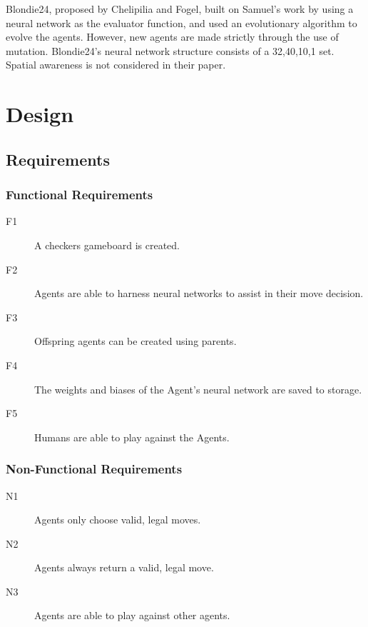 \documentclass[12pt,a4paper]{article}
\begin{document}
Blondie24, proposed by Chelipilia and Fogel, built on Samuel's work by using a neural network as the evaluator function, and used an evolutionary algorithm to evolve the agents. However, new agents are made strictly through the use of mutation. Blondie24's neural network structure consists of a {32,40,10,1} set. Spatial awareness is not considered in their paper.


\section{Design}

\subsection*{Requirements}

\subsubsection*{Functional Requirements}

\begin{description}
    \item [F1] A checkers gameboard is created.
    \item [F2] Agents are able to harness neural networks to assist in their move decision.
    \item [F3] Offspring agents can be created using parents.
    \item [F4] The weights and biases of the Agent's neural network are saved to storage.
    \item [F5] Humans are able to play against the Agents.
    
\end{description}

\subsubsection*{Non-Functional Requirements}

\begin{description}  
    \item [N1] Agents only choose valid, legal moves.
    \item [N2] Agents always return a valid, legal move.
    \item [N3] Agents are able to play against other agents.
\end{description}
\end{document}
